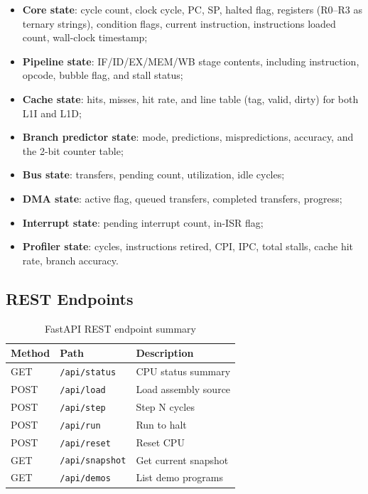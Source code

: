 \documentclass[10pt,a4paper,twoside]{book}
\begin{document}
\begin{itemize}
    \item \textbf{Core state}: cycle count, clock cycle, PC, SP, halted
          flag, registers (R0--R3 as ternary strings), condition flags,
          current instruction, instructions loaded count, wall-clock
          timestamp;
    \item \textbf{Pipeline state}: IF/ID/EX/MEM/WB stage contents,
          including instruction, opcode, bubble flag, and stall status;
    \item \textbf{Cache state}: hits, misses, hit rate, and line table
          (tag, valid, dirty) for both L1I and L1D;
    \item \textbf{Branch predictor state}: mode, predictions,
          mispredictions, accuracy, and the 2-bit counter table;
    \item \textbf{Bus state}: transfers, pending count, utilization,
          idle cycles;
    \item \textbf{DMA state}: active flag, queued transfers, completed
          transfers, progress;
    \item \textbf{Interrupt state}: pending interrupt count, in-ISR flag;
    \item \textbf{Profiler state}: cycles, instructions retired, CPI,
          IPC, total stalls, cache hit rate, branch accuracy.
\end{itemize}

\subsection{REST Endpoints}

\begin{table}[H]
\centering
\caption{FastAPI REST endpoint summary}
\label{tab:restendpoints}
\begin{tabular}{lll}
\toprule
Method & Path & Description \\
\midrule
GET  & \texttt{/api/status}  & CPU status summary \\
POST & \texttt{/api/load}    & Load assembly source \\
POST & \texttt{/api/step}    & Step N cycles \\
POST & \texttt{/api/run}     & Run to halt \\
POST & \texttt{/api/reset}   & Reset CPU \\
GET  & \texttt{/api/snapshot}& Get current snapshot \\
GET  & \texttt{/api/demos}   & List demo programs \\
\bottomrule
\end{tabular}
\end{table}
\end{document}

